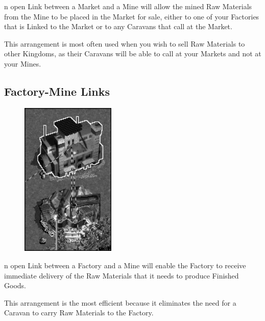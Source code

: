 
n open Link between a Market and a Mine will allow the mined Raw Materials from the Mine to be placed in the Market for sale, either to one of your Factories that is Linked to the Market or to any Caravans that call at the Market.

This arrangement is most often used when you wish to sell Raw Materials to other Kingdoms, as their Caravans will be able to call at your Markets and not at your Mines.

\subsection{\textsf{Factory-Mine Links}}


\begin{figure}
    \vspace{-20pt}
    \begin{center}
        \includegraphics[width=0.4\textwidth]{Ilink_minefactory} %
    \end{center}
    \vspace{-20pt}
\end{figure}

n open Link between a Factory and a Mine will enable the Factory to receive immediate delivery of the Raw Materials that it needs to produce Finished Goods.

This arrangement is the most efficient because it eliminates the need for a Caravan to carry Raw Materials to the Factory.

\clearpage

